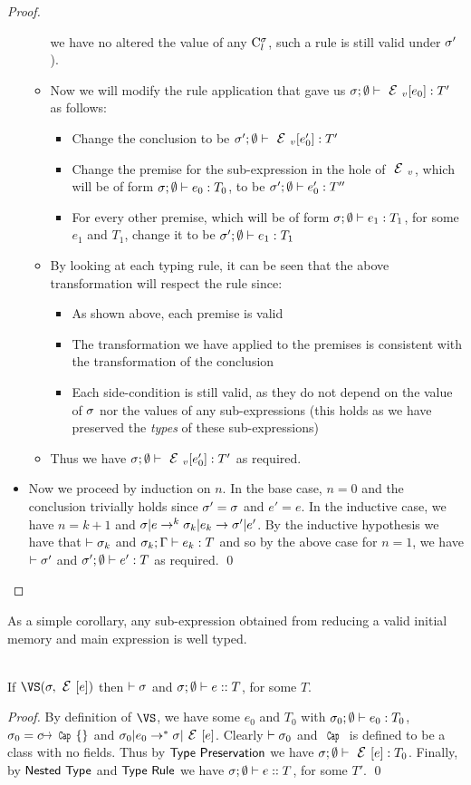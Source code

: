 \begin{proof}
\begin{itemize}
\begin{itemize}
			we have no altered the value of any $\C[\s]l$, such a rule is still
			valid under $\s'$).
			\item Now we will modify the rule application that gave us $\tyr{\EV[e_0]}{T'}$
			as follows:
			\begin{itemize}
				\item Change the conclusion to be $\tyr[\s']{\EV[e'_0]}{T'}$
				\item Change the premise for the sub-expression in the hole of $\EV$, which
				will be of form $\tyr{e_0}{T_0}$, to be $\tyr[\s']{e'_0}{T''}$
				\item For every other premise, which will be of form $\tyr{e_1}{T_1}$,
				for some $e_1$ and $T_1$, change it to be $\tyr[\s']{e_1}{T_1}$
			\end{itemize}
			\item By looking at each typing rule, it can be seen that the above transformation
			will respect the rule since:
			\begin{itemize}
				\item As shown above, each premise is valid
				\item The transformation we have applied to the premises is consistent with
				the transformation of the conclusion
				\item Each side-condition is still valid, as they do not depend on the value
				of $\s$ nor the values of any sub-expressions (this holds as we have
				preserved the \emph{types} of these sub-expressions)
			\end{itemize}
			\item Thus we have $\tyr{\EV[e'_0]}{T'}$ as required.
		\end{itemize}
	\item Now we proceed by induction on $n$. In the base case, $n = 0$ and
	the conclusion trivially holds since $\s' = \s$ and $e' = e$. In the
	inductive case, we have $n = k+1$ and $\s|e\rightarrow^{k}\s_k|e_k\rightarrow\s'|e'$.
	By the inductive hypothesis we have that $\vdash\s_k$ and $\ty[\s_k][\G]{e_k}T$
	and so by the above case for $n = 1$, we have $\vdash\s'$ and $\tyr[\s']{e'}T$
	as required.
	\qed\end{itemize}
\end{proof}


As a simple corollary, any sub-expression obtained from reducing a valid initial memory and main expression is well typed.

\SS\begin{Corollary}\ \\
	\indent If $\VS(\s,\E[e])$ then $\vdash\s$ and $\tyer eT$, for some $T$.
\end{Corollary}
\SS\begin{proof}
	By definition of $\VS$, we have some $e_0$ and $T_0$ with $\tyr[\s_0]{e_0}T_0$,
	$\s_0 = c\mapsto\Kw{Cap}\{\}$ and $\s_0|e_0\rightarrow^*\s|\E[e]$. Clearly
	$\vdash\s_0$ and $\Kw{Cap}$ is defined to be a class with no fields.
	Thus by $\thm{Type Preservation}$ we have $\tyr {\E[e]}{T_0}$.
	Finally, by $\thm{Nested Type}$ and $\thm{Type Rule}$ we have
	$\tyer eT$, for some
	$T'$.
\qed\end{proof}

